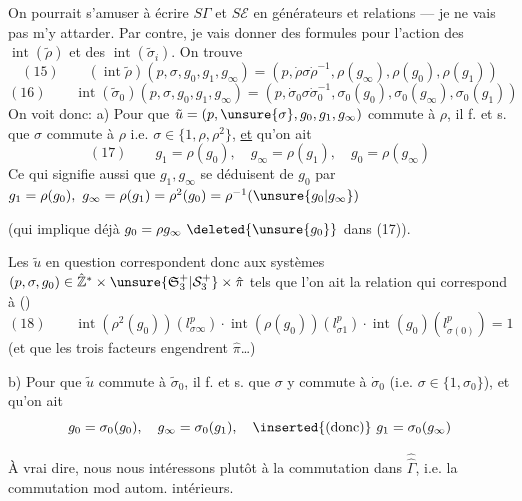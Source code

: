 On pourrait s'amuser à écrire $S\Gamma$ et $S\mathcal E$ en générateurs et relations --- je ne vais pas m'y attarder. Par contre, je vais donner des formules pour l'action des $\operatorname{int}(\tilde\rho)$ et des $\operatorname{int}(\tilde\sigma_i)$. On trouve
\[
(15)\qquad(\operatorname{int}\tilde\rho)(p,\sigma,g_0,g_1,g_\infty)=(p,\dot\rho\sigma\dot\rho^{-1},\rho(g_\infty),\rho(g_0),\rho(g_1))
\]
\[
(16)\qquad\operatorname{int}(\tilde\sigma_0)(p,\sigma,g_0,g_1,g_\infty)=(p,\dot\sigma_0\sigma\dot\sigma_0^{-1},\sigma_0(g_0),\sigma_0(g_\infty),\sigma_0(g_1))
\]
On voit donc: a) Pour que $\tilde u=(p,\unsure{\sigma},g_0,g_1,g_\infty)$ commute à $\rho$, il f. et s. que  $\sigma$ commute à $\rho$ i.e. $\sigma\in\{1,\rho,\rho^2\}$, \uline{et} qu'on ait
\[
(17)\qquad g_1=\rho(g_0),\quad g_\infty=\rho(g_1),\quad g_0=\rho(g_\infty)
\]
Ce qui signifie aussi que $g_1,g_\infty$ se déduisent de $g_0$ par $g_1=\rho(g_0),\ g_\infty=\rho(g_1)=\rho^2(g_0)=\rho^{-1}(\unsure{g_0|g_\infty})$

(qui implique déjà $g_0=\rho g_\infty\ \deleted{\unsure{g_0}}$ dans (17)).

Les $\tilde u$ en question correspondent donc aux systèmes $(p,\sigma,g_0)\in\hat{\mathbb Z}^*\times\unsure{\mathfrak S_3^+|\mathcal S_3^+}\times\hat\pi$ tels que l'on ait la relation qui correspond à ()
\[
(18)\qquad\operatorname{int}(\rho^2(g_0))(l_{\sigma\infty}^p)\cdot\operatorname{int}(\rho(g_0))(l_{\sigma1}^p)\cdot\operatorname{int}(g_0)(l_{\sigma(0)}^p)=1
\]
(et que les trois facteurs engendrent $\hat\pi$\ldots)

b) Pour que $\tilde u$ commute à $\tilde\sigma_0$, il f. et s. que $\sigma$ y commute à $\dot\sigma_0$ (i.e. $\sigma\in\{1,\sigma_0\}$), et qu'on ait
\[
g_0=\sigma_0(g_0),\quad g_\infty=\sigma_0(g_1),\quad\inserted{\text{(donc)}}\ g_1=\sigma_0(g_\infty)
\]



À vrai dire, nous nous intéressons plutôt à la commutation dans $\widehat{\widehat\Gamma}$, i.e. la commutation mod autom. intérieurs.
